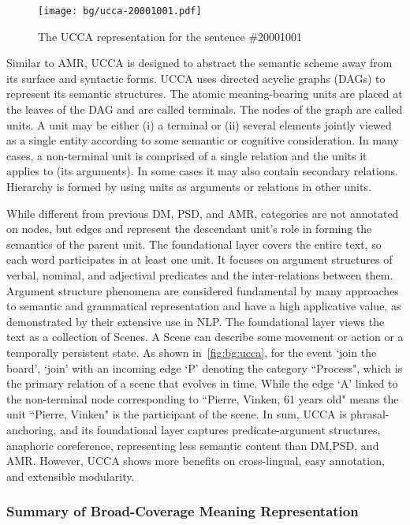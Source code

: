 \begin{figure}[!th]
\centering
\texttt{[image: bg/ucca-20001001.pdf]}
\caption{\label{fig:bg:ucca}The UCCA representation for the sentence
  \#20001001}
\end{figure}

Similar to AMR, UCCA is designed to abstract the semantic scheme away
from its surface and syntactic forms. UCCA uses directed acyclic
graphs (DAGs) to represent its semantic structures. The atomic
meaning-bearing units are placed at the leaves of the DAG and are
called terminals. The nodes of the graph are called units. A unit may
be either (i) a terminal or (ii) several elements jointly viewed as a
single entity according to some semantic or cognitive
consideration. In many cases, a non-terminal unit is comprised of a
single relation and the units it applies to (its arguments). In some
cases it may also contain secondary relations. Hierarchy is formed by
using units as arguments or relations in other units.

While different from previous DM, PSD, and AMR, categories are not
annotated on nodes, but edges and represent the descendant unit's
role in forming the semantics of the parent unit. The foundational
layer covers the entire text, so each word
participates in at least one unit. It focuses on argument structures
of verbal, nominal, and adjectival predicates and the inter-relations
between them. Argument structure phenomena are considered fundamental by
many approaches to semantic and grammatical representation and have a
high applicative value, as demonstrated by their extensive use in
NLP. The foundational layer views the text as a collection of
Scenes. A Scene can describe some movement or action or a temporally
persistent state. As shown in~\autoref{fig:bg:ucca}, for the event
`join the board', `join' with an incoming edge `P' denoting the
category ``Process", which is the primary relation of a scene that
evolves in time. While the edge `A' linked to the non-terminal node
corresponding to ``Pierre, Vinken, 61 years old" means the unit
``Pierre, Vinken" is the participant of the scene. In sum, UCCA is
phrasal-anchoring, and its foundational layer captures
predicate-argument structures, anaphoric coreference, representing
less semantic content than DM,PSD, and AMR. However, UCCA shows more
benefits on cross-lingual, easy annotation, and extensible modularity.

\subsubsection{Summary of Broad-Coverage Meaning Representation}
\label{ssec:bg:summary-broad-coverage}

